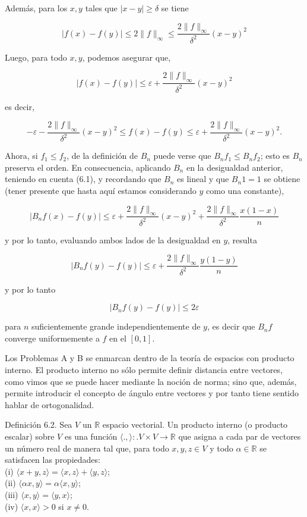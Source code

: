 \documentclass[10pt]{article}
\begin{document}
Además, para los $x, y$ tales que $|x-y| \geq \delta$ se tiene

$$
|f(x)-f(y)| \leq 2\|f\|_{\infty} \leq \frac{2\|f\|_{\infty}}{\delta^{2}}(x-y)^{2}
$$

Luego, para todo $x, y$, podemos asegurar que,

$$
|f(x)-f(y)| \leq \varepsilon+\frac{2\|f\|_{\infty}}{\delta^{2}}(x-y)^{2}
$$

es decir,

$$
-\varepsilon-\frac{2\|f\|_{\infty}}{\delta^{2}}(x-y)^{2} \leq f(x)-f(y) \leq \varepsilon+\frac{2\|f\|_{\infty}}{\delta^{2}}(x-y)^{2} .
$$

Ahora, si $f_{1} \leq f_{2}$, de la definición de $B_{n}$ puede verse que $B_{n} f_{1} \leq B_{n} f_{2}$; esto es $B_{n}$ preserva el orden. En consecuencia, aplicando $B_{n}$ en la desigualdad anterior, teniendo en cuenta (6.1), y recordando que $B_{n}$ es lineal y que $B_{n} 1=1$ se obtiene (tener presente que hasta aquí estamos considerando $y$ como una constante),

$$
\left|B_{n} f(x)-f(y)\right| \leq \varepsilon+\frac{2\|f\|_{\infty}}{\delta^{2}}(x-y)^{2}+\frac{2\|f\|_{\infty}}{\delta^{2}} \frac{x(1-x)}{n}
$$

y por lo tanto, evaluando ambos lados de la desigualdad en $y$, resulta

$$
\left|B_{n} f(y)-f(y)\right| \leq \varepsilon+\frac{2\|f\|_{\infty}}{\delta^{2}} \frac{y(1-y)}{n}
$$

y por lo tanto

$$
\left|B_{n} f(y)-f(y)\right| \leq 2 \varepsilon
$$

para $n$ suficientemente grande independientemente de $y$, es decir que $B_{n} f$ converge uniformemente a $f$ en el $[0,1]$.

Los Problemas A y B se enmarcan dentro de la teoría de espacios con producto interno. El producto interno no sólo permite definir distancia entre vectores, como vimos que se puede hacer mediante la noción de norma; sino que, además, permite introducir el concepto de ángulo entre vectores y por tanto tiene sentido hablar de ortogonalidad.

Definición 6.2. Sea $V$ un $\mathbb{R}$ espacio vectorial. Un producto interno (o producto escalar) sobre $V$ es una función $\langle.,\rangle:. V \times V \rightarrow \mathbb{R}$ que asigna a cada par de vectores un número real de manera tal que, para todo $x, y, z \in V$ y todo $\alpha \in \mathbb{R}$ se satisfacen las propiedades:\\
(i) $\langle x+y, z\rangle=\langle x, z\rangle+\langle y, z\rangle$;\\
(ii) $\langle\alpha x, y\rangle=\alpha\langle x, y\rangle$;\\
(iii) $\langle x, y\rangle=\langle y, x\rangle$;\\
(iv) $\langle x, x\rangle>0$ si $x \neq 0$.
\end{document}
